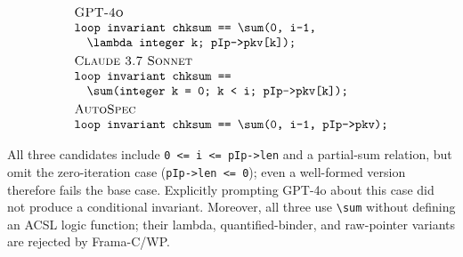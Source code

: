 {\footnotesize
\[
\begin{array}{@{}l@{}}
\textsc{GPT-4o}\\
\texttt{loop invariant chksum == \textbackslash sum(0, i-1,}\\
\quad\texttt{\textbackslash lambda integer k; pIp->pkv[k]);}\\[3pt]
\textsc{Claude 3.7 Sonnet}\\
\texttt{loop invariant chksum ==}\\
\quad\texttt{\textbackslash sum(integer k = 0; k < i; pIp->pkv[k]);}\\[3pt]
\autospec\\
\texttt{loop invariant chksum == \textbackslash sum(0, i-1, pIp->pkv);}
\end{array}
\]
}

All three candidates include \texttt{0 <= i <= pIp->len} and a partial-sum relation, but omit the zero-iteration case (\texttt{pIp->len <= 0}); even a well-formed version therefore fails the base case. Explicitly prompting GPT-4o about this case did not produce a conditional invariant. Moreover, all three use \texttt{\textbackslash sum} without defining an ACSL logic function; their lambda, quantified-binder, and raw-pointer variants are rejected by Frama-C/WP.
 

 

 


 

